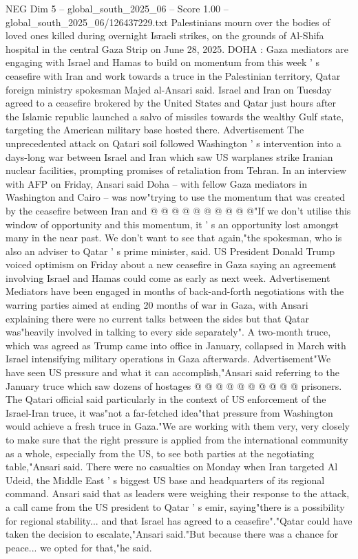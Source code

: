 \begin{textsample}{NEG Dim 5 – global\_south\_2025\_06 – Score 1.00 – global\_south\_2025\_06/126437229.txt}  \label{ex:f5_neg_412}
Palestinians mourn over the bodies of loved ones killed during overnight Israeli strikes, on the grounds of Al-Shifa hospital in the central Gaza Strip on June 28, 2025.
DOHA : Gaza mediators are engaging with Israel and Hamas to build on momentum from this week ' s ceasefire with Iran and work towards a truce in the Palestinian territory, Qatar foreign ministry spokesman Majed al-Ansari said.
Israel and Iran on Tuesday agreed to a ceasefire brokered by the United States and Qatar just hours after the Islamic republic launched a salvo of missiles towards the wealthy Gulf state, targeting the American military base hosted there.
Advertisement The unprecedented attack on Qatari soil followed Washington ' s intervention into a days-long war between Israel and Iran which saw US warplanes strike Iranian nuclear facilities, prompting promises of retaliation from Tehran.
In an interview with AFP on Friday, Ansari said Doha -- with fellow Gaza mediators in Washington and Cairo -- was now"trying to use the momentum that was created by the ceasefire between Iran and @ @ @ @ @ @ @ @ @ @"If we don't utilise this window of opportunity and this momentum, it ' s an opportunity lost amongst many in the near past.
We don't want to see that again,"the spokesman, who is also an adviser to Qatar ' s prime minister, said.
US President Donald Trump voiced optimism on Friday about a new ceasefire in Gaza saying an agreement involving Israel and Hamas could come as early as next week.
Advertisement Mediators have been engaged in months of back-and-forth negotiations with the warring parties aimed at ending 20 months of war in Gaza, with Ansari explaining there were no current talks between the sides but that Qatar was"heavily involved in talking to every side separately".
A two-month truce, which was agreed as Trump came into office in January, collapsed in March with Israel intensifying military operations in Gaza afterwards.
Advertisement"We have seen US pressure and what it can accomplish,"Ansari said referring to the January truce which saw dozens of hostages @ @ @ @ @ @ @ @ @ @ prisoners.
The Qatari official said particularly in the context of US enforcement of the Israel-Iran truce, it was"not a far-fetched idea"that pressure from Washington would achieve a fresh truce in Gaza."We are working with them very, very closely to make sure that the right pressure is applied from the international community as a whole, especially from the US, to see both parties at the negotiating table,"Ansari said.
There were no casualties on Monday when Iran targeted Al Udeid, the Middle East ' s biggest US base and headquarters of its regional command.
Ansari said that as leaders were weighing their response to the attack, a call came from the US president to Qatar ' s emir, saying"there is a possibility for regional stability... and that Israel has agreed to a ceasefire"."Qatar could have taken the decision to escalate,"Ansari said."But because there was a chance for peace... we opted for that,"he said.

\end{textsample}
